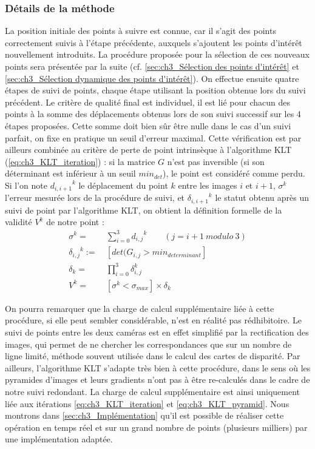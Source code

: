 \subsubsection{Détails de la méthode}
La position initiale des points à suivre est connue, car il s'agit des points correctement suivis à l'étape précédente, auxquels s'ajoutent les points d'intérêt nouvellement introduits. La procédure proposée pour la sélection de ces nouveaux points sera présentée par la suite (cf. \ref{sec:ch3_Sélection des points d'intérêt} et \ref{sec:ch3_Sélection dynamique des points d'intérêt}). On effectue ensuite quatre étapes de suivi de points, chaque étape utilisant la position obtenue lors du suivi précédent. Le critère de qualité final est individuel, il est lié pour chacun des points à la somme des déplacements obtenus lors de son suivi successif sur les 4 étapes proposées. Cette somme doit bien sûr être nulle dans le cas d'un suivi parfait, on fixe en pratique un seuil d'erreur maximal. Cette vérification est par ailleurs combinée au critère de perte de point intrinsèque à l'algorithme KLT (\ref{eq:ch3_KLT_iteration}) : si la matrice $G$ n'est pas inversible (si son déterminant est inférieur à un seuil $min_{det}$), le point est considéré comme perdu. Si l'on note ${d_{i,i+1}}^k$ le déplacement du point $k$ entre les images $i$ et $i+1$, $\sigma^k$ l'erreur mesurée lors de la procédure de suivi, et ${\delta_{i,i+1}}^k$ le statut obtenu après un suivi de point par l'algorithme KLT, on obtient la définition formelle de la validité $V^k$ de notre point :\\
\begin{align}
	\sigma^k 					=& \: \sum\limits_{i=0}^{3} {d_{i,j}}^k  \qquad (j = i+1 \: modulo \: 3)\\
	{\delta_{i,j}}^k :=& \: [ det(G_{i,j} > min_{determinant}] 	\\
	\delta_k 					=& \: \prod\limits_{i=0}^{3} \delta_{i,j}^k 				\\
	V^k 							=& \: [\sigma^k < {\sigma}_{max}] \times \delta_k
\end{align}

On pourra remarquer que la charge de calcul supplémentaire liée à cette procédure, si elle peut sembler considérable, n'est en réalité pas rédhibitoire. Le suivi de points entre les deux caméras est en effet simplifié par la rectification des images, qui permet de ne chercher les correspondances que sur un nombre de ligne limité, méthode souvent utilisée dans le calcul des cartes de disparité. Par ailleurs, l'algorithme KLT s'adapte très bien à cette procédure, dans le sens où les pyramides d'images et leurs gradients n'ont pas à être re-calculés dans le cadre de notre suivi redondant. La charge de calcul supplémentaire est ainsi uniquement liée aux itérations \ref{eq:ch3_KLT_iteration} et \ref{eq:ch3_KLT_pyramid}. Nous montrons dans \ref{sec:ch3_Implémentation} qu'il est possible de réaliser cette opération en temps réel et sur un grand nombre de points (plusieurs milliers) par une implémentation adaptée.

